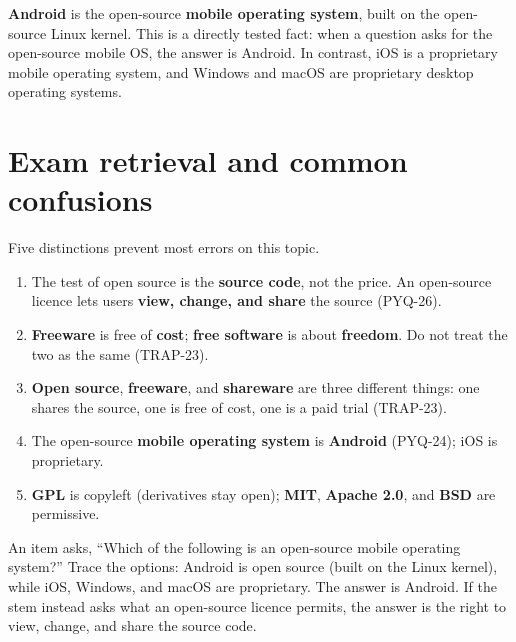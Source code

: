 \textbf{Android} is the open-source \textbf{mobile operating system}, built on
the open-source Linux kernel. This is a directly tested fact: when a question
asks for the open-source mobile OS, the answer is Android. In contrast, iOS is
a proprietary mobile operating system, and Windows and macOS are proprietary
desktop operating systems.

\section{Exam retrieval and common confusions}
Five distinctions prevent most errors on this topic.
\begin{enumerate}
  \item The test of open source is the \textbf{source code}, not the price. An
    open-source licence lets users \textbf{view, change, and share} the source
    (PYQ-26).
  \item \textbf{Freeware} is free of \textbf{cost}; \textbf{free software} is
    about \textbf{freedom}. Do not treat the two as the same (TRAP-23).
  \item \textbf{Open source}, \textbf{freeware}, and \textbf{shareware} are
    three different things: one shares the source, one is free of cost, one is
    a paid trial (TRAP-23).
  \item The open-source \textbf{mobile operating system} is \textbf{Android}
    (PYQ-24); iOS is proprietary.
  \item \textbf{GPL} is copyleft (derivatives stay open); \textbf{MIT},
    \textbf{Apache 2.0}, and \textbf{BSD} are permissive.
\end{enumerate}

\begin{example}
An item asks, ``Which of the following is an open-source mobile operating
system?'' Trace the options: Android is open source (built on the Linux
kernel), while iOS, Windows, and macOS are proprietary. The answer is Android.
If the stem instead asks what an open-source licence permits, the answer is the
right to view, change, and share the source code.
\end{example}

